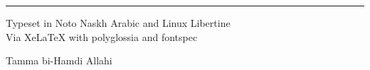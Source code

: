 \documentclass[11pt,a4paper]{book}
\begin{document}
\vfill

\begin{center}
\rule{0.3\textwidth}{0.4pt}

\vspace{0.3cm}

{\small\latinfont Typeset in Noto Naskh Arabic and Linux Libertine}\\[0.1cm]
{\small\latinfont Via XeLaTeX with polyglossia and fontspec}
\end{center}

\vspace{0.3cm}

\begin{tcolorbox}[colback=arabicbg,colframe=dropgold,arc=3pt,boxrule=0.6pt,width=0.5\textwidth,halign=center]
{\Large Tamma bi-Hamdi Allahi}
\end{tcolorbox}
\end{document}
